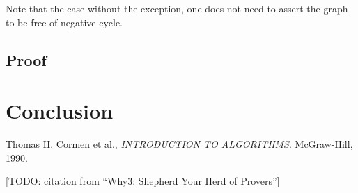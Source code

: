 \documentclass[a4paper,12pt]{article}
\begin{document}
Note that the case without the exception, one does not need to assert the graph to be free of negative-cycle.



\subsection{Proof}

\section{Conclusion}



\begin{thebibliography}{9}

  Thomas H. Cormen et al.,
  \emph{INTRODUCTION TO ALGORITHMS}.
  McGraw-Hill,
  1990.


[TODO: citation from ``Why3: Shepherd Your Herd of Provers'']

\end{thebibliography}
\end{document}
